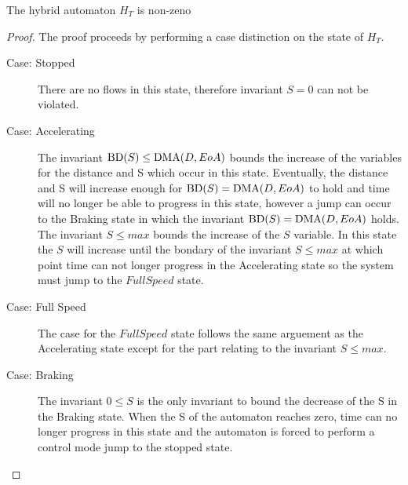 \begin{mytheorem}
The hybrid automaton  $H_{T}$ is non-zeno
\begin{proof}
The proof proceeds by performing a case distinction on the state of $H_{T}$.
\begin{description}
\item[Case: Stopped] There are no flows in this state, therefore invariant $S = 0$ can not be violated.


\item[Case: Accelerating] The invariant $\mathrm{BD}(S) \leq \mathrm{DMA}(D,EoA)$ bounds the increase of the variables for the distance and S which occur in this state. Eventually, the distance and S will increase enough for $\mathrm{BD}(S) = \mathrm{DMA}(D,EoA)$ to hold and time will no longer be able to progress in this state, however a jump can occur to the Braking state in which the invariant $\mathrm{BD}(S) = \mathrm{DMA}(D,EoA)$ holds. The invariant $S \leq max$ bounds the increase of the $S$ variable. In this state the $S$ will increase until the bondary of the invariant $S \leq max$ at which point time can not longer progress in the Accelerating state so the system must jump to the $Full Speed$ state.


\item[Case: Full Speed] 
The case for the $Full Speed$ state follows the same arguement as the Accelerating state except for the part relating to the invariant $S \leq max$.

\item[Case: Braking]
The invariant $0 \leq S$ is the only invariant to bound the decrease of the S in the Braking state. When the S of  the automaton reaches zero, time can no longer progress in this state and the automaton is forced to perform a control mode jump to the stopped state.
\end{description}
\end{proof}
\end{mytheorem}





